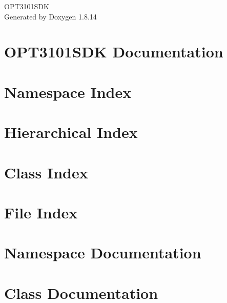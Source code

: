 \documentclass[twoside]{book}
\newcommand{\+}{\discretionary{\mbox{\scriptsize$\hookleftarrow$}}{}{}}
\newcommand{\clearemptydoublepage}{%
  \newpage{\pagestyle{empty}\cleardoublepage}%
}
\begin{document}
\hypersetup{pageanchor=false,
             bookmarksnumbered=true,
             pdfencoding=unicode
            }
\begin{titlepage}
\vspace*{7cm}
\begin{center}%
{\Large O\+P\+T3101\+S\+DK }\\
\vspace*{1cm}
{\large Generated by Doxygen 1.8.14}\\
\end{center}
\end{titlepage}
\clearemptydoublepage
{}
\tableofcontents
\clearemptydoublepage
{}
\hypersetup{pageanchor=true}

\chapter{O\+P\+T3101\+S\+DK Documentation}
\label{index}\hypertarget{index}{}
\chapter{Namespace Index}

\chapter{Hierarchical Index}

\chapter{Class Index}

\chapter{File Index}

\chapter{Namespace Documentation}




\chapter{Class Documentation}






















\end{document}
